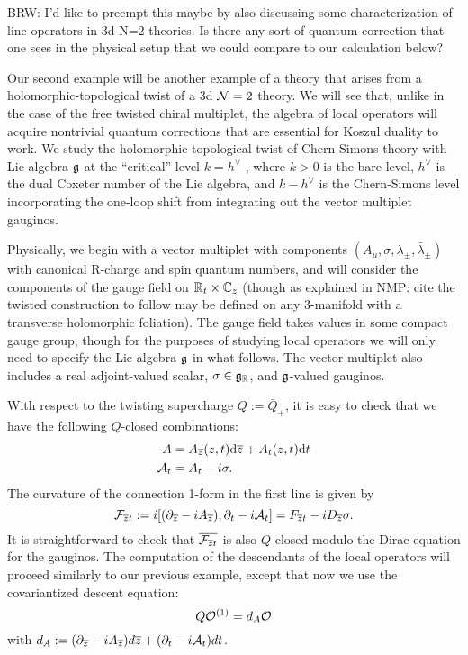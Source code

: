\documentclass[11pt]{amsart}
\def\brian#1{{\textcolor{blue!65!red}{BRW: {#1}}}}
\def\natalie#1{{\textcolor{green!65!black}{NMP: {#1}}}}
\begin{document}
\brian{I'd like to preempt this maybe by also discussing some characterization of line operators in 3d N=2 theories. 
Is there any sort of quantum correction that one sees in the physical setup that we could compare to our calculation below?}

Our second example will be another example of a theory that arises from a holomorphic-topological twist of a 3d $\mathcal N=2$ theory. We will see that, unlike in the case of the free twisted chiral multiplet, the algebra of local operators will acquire nontrivial quantum corrections that are essential for Koszul duality to work. We study the holomorphic-topological twist of Chern-Simons theory with Lie algebra $\mathfrak g$ at the ``critical'' level $k = h^{\vee}$ , where $k > 0$ is the bare level, $h^{\vee}$ is the dual Coxeter number of the Lie algebra, and $k - h^{\vee}$ is the Chern-Simons level incorporating the one-loop shift from integrating out the vector multiplet gauginos. 

Physically, we begin with a vector multiplet with components $(A_{\mu}, \sigma, \lambda_{\pm}, \bar{\lambda}_{\pm})$ with canonical R-charge and spin quantum numbers, and will consider the components of the gauge field on $\mathbb R_t \times \mathbb C_{z}$ (though as explained in \natalie{cite} the twisted construction to follow may be defined on any 3-manifold with a transverse holomorphic foliation). The gauge field takes values in some compact gauge group, though for the purposes of studying local operators we will only need to specify the Lie algebra $\mathfrak g$ in what follows. The vector multiplet also includes a real adjoint-valued scalar, $\sigma \in \mathfrak g_{\mathbb R}$, and $\mathfrak g$-valued gauginos. 

With respect to the twisting supercharge $Q:= \bar{Q}_+$, it is easy to check that we have the following $Q$-closed combinations:
\begin{align}
A & = A_{{\overline{z}}} (z,t) {\rm d} {\overline{z}} + A_{t} (z, t) {\rm d} t \\
\mathcal A_t &= A_t - i \sigma.
\end{align}
The curvature of the connection 1-form in the first line is given by
\[
\mathcal F_{{\overline{z}} t} := i  [(\partial_{{\overline{z}}} - i A_{{\overline{z}}}), \partial_t - i \mathcal A_t] = F_{{\overline{z}} t} - i D_{{\overline{z}}}\sigma.
\] It is straightforward to check that $\overline{\mathcal F_{{\overline{z}} t}}$ is also $Q$-closed modulo the Dirac equation for the gauginos. 
The computation of the descendants of the local operators will proceed similarly to our previous example, except that now we use the covariantized descent equation:
\[
Q \mathcal O^{(1)} = d_{A} \mathcal O
\] with $d_A := (\partial_{{\overline{z}}} - i A_{{\overline{z}}})d{\overline{z}} + (\partial_t - i \mathcal A_t)dt$. 
\end{document}
